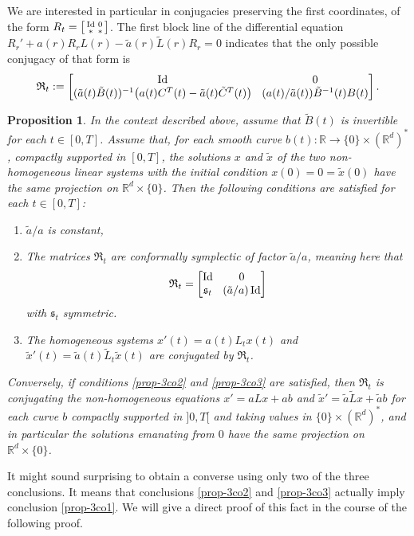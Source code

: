 \documentclass[10pt]{amsart}
\newenvironment{smallbmatrix}{\big[\begin{smallmatrix}}{\end{smallmatrix}\big]}
\DeclareMathOperator{\Id}{Id}
\newcommand{\Rm}{\mathbb{R}}
\newcommand{\gs}{\ensuremath{\mathfrak{s}}}
\newcommand{\gR}{\ensuremath{\mathfrak{R}}}
\theoremstyle{plain}
\newtheorem{prop}[lem]{Proposition}
\theoremstyle{definition}
\begin{document}
We are interested in particular in conjugacies preserving the first coordinates, \ie of the form
$R_t = \begin{smallbmatrix} \Id&0\\ * &* \end{smallbmatrix}$. The first block line of the differential equation
$
R_{r}' +a(r)R_{r}L(r)-\tilde a(r)\tilde L(r)R_{r}=0
$
indicates that the only possible conjugacy of that form is
\[\arraycolsep4.5pt
\gR_{t}:=
\begin{bmatrix}
\Id&0\\
(\tilde a(t)\tilde B(t))^{-1}\big( a(t)C^T(t)-\tilde a(t) \tilde C^T(t)\big) & (a(t)/\tilde a(t)) \tilde B^{-1}(t) B(t)
\end{bmatrix}.
\]

\begin{prop}\label{prop-3co}
In the context described above, assume that $\tilde B(t)$ is invertible for each $t\in [0,T]$.
Assume that, for each smooth curve $b(t):\Rm \to \{0\}\times (\Rm^d)^*$, compactly supported in $[0,T]$, the solutions
$x$ and $\tilde x$ of the two non-homogeneous linear systems with the initial condition $x(0)=0=\tilde x(0)$ have the same projection on $\Rm^d\times \{0\}$.
Then the following conditions are satisfied for each $t\in [0,T]$:
\begin{enumerate}
\item\label{prop-3co1} $\tilde a/a$ is constant,
\item\label{prop-3co2} The matrices $\gR_t$ are conformally symplectic of factor $\tilde a/a$, meaning here that
\[\arraycolsep4.5pt
\gR_t=\begin{bmatrix}
\Id&0\\ \gs_t &(\tilde a /a) \Id
\end{bmatrix}\]
with $\gs_t$ symmetric.
\item\label{prop-3co3} The homogeneous systems $x'(t)=a(t)L_tx(t)$ and $\tilde x'(t)=\tilde a(t)\tilde L_t\tilde x(t)$ are conjugated by $\gR_t$.
\end{enumerate}
Conversely, if conditions \eqref{prop-3co2} and \eqref{prop-3co3} are satisfied, then $\gR_t$ is conjugating the non-homogeneous equations $x'= aLx+ab$ and $\tilde x'=\tilde a \tilde L x+\tilde a b$ for each curve $b$ compactly supported in $]0,T[$ and taking
values in $\{0\}\times (\Rm^d)^*$, and in particular the solutions emanating from $0$ have the same projection on $\Rm^d\times \{0\}$.
\end{prop}

It might sound surprising to obtain a converse using only two of the three conclusions. It means that conclusions \eqref{prop-3co2} and \eqref{prop-3co3} actually imply conclusion \eqref{prop-3co1}. We will give a direct proof of this fact in the course of the following proof.
\end{document}
